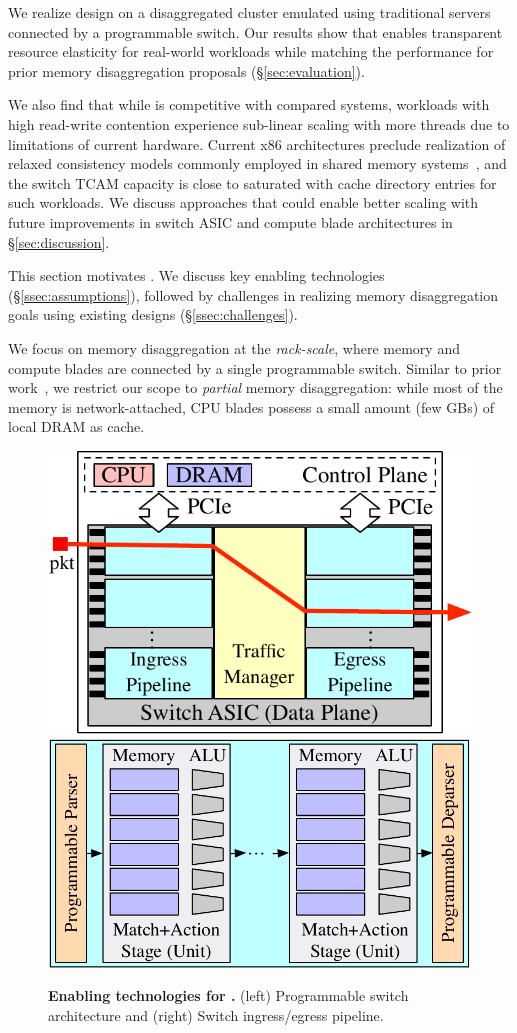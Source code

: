 \noindent
We realize \mind design on a disaggregated cluster emulated using traditional servers connected by a programmable switch. Our results show that \mind enables transparent resource elasticity for real-world workloads while matching the performance for prior memory disaggregation proposals (\S\ref{sec:evaluation}). 

We also find that while \mind is competitive with compared systems, workloads with high read-write contention experience sub-linear scaling with more threads due to limitations of current hardware. Current x86 architectures preclude realization of relaxed consistency models commonly employed in shared memory systems~\cite{gam}, and the switch TCAM capacity is close to saturated with cache directory entries for such workloads. We discuss approaches that could enable better scaling with future improvements in switch ASIC and compute blade architectures in \S\ref{sec:discussion}.


This section motivates \mind. We discuss key enabling technologies (\S\ref{ssec:assumptions}), followed by challenges in realizing memory disaggregation goals using existing designs (\S\ref{ssec:challenges}).

 We focus on memory disaggregation at the \textit{rack-scale}, where memory and compute blades are connected by a single programmable switch. Similar to prior work~\cite{memdisagg2, memdisagg3, memdisagg4, memdisagg5, memdisagg6, memdisagg1, legoos, disagg}, we restrict our scope to \textit{partial} memory disaggregation: while most of the memory is network-attached, CPU blades possess a small amount (few GBs) of local DRAM as cache.

\begin{figure}[t]
  \centering
  \includegraphics[width=0.44\columnwidth]{fig/mind/prog-switch.pdf}\hfill
  \includegraphics[width=0.54\columnwidth]{fig/mind/prog-pipeline.pdf}
  \vspace{-0.7em}
  \caption[Enabling technologies for \mind]{\textbf{Enabling technologies for \mind.} (left) Programmable switch architecture and (right) Switch ingress/egress pipeline.}
  \vspace{-0.5em}
  \label{fig:trad-directory}
  \label{fig:prog-pipeline}
  \label{fig:background}
\end{figure}


